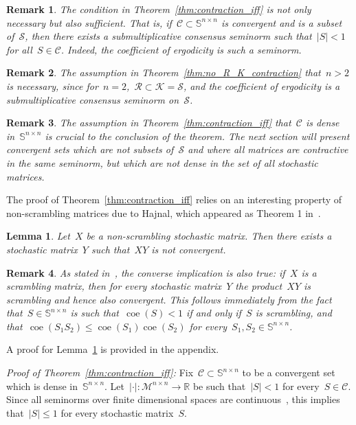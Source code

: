 \documentclass[letterpaper, 10 pt, conference]{ieeeconf}  %
\newtheorem{lemma}{Lemma}
\newtheorem{remark}{Remark}
\newcommand{\R}{\mathbb R}
\newcommand{\gensn}[1]{|#1|} %
\DeclareMathOperator{\coe}{coe} %
\newcommand{\eqrowsum}{\mathcal{M}} %
\newcommand{\stoc}{\mathbb{S}} %
\newcommand{\stocpd}{\mathcal{R}} %
\newcommand{\stocsary}{\mathcal{K}} %
\newcommand{\stocscr}{\mathcal{S}} %
\begin{document}
\begin{remark}
    The condition in Theorem~\ref{thm:contraction_iff} is not only necessary but also sufficient. That is, if~$\mathcal{C} \subset \stoc^{n \times n}$ is convergent and is a subset of~$\stocscr$, then there exists a submultiplicative consensus seminorm such that~$\gensn{S} < 1$ for all~$S \in \mathcal{C}$. Indeed, the coefficient of ergodicity is such a seminorm.
\end{remark}

\begin{remark}
    The assumption in Theorem~\ref{thm:no_R_K_contraction} that~$n > 2$ is necessary, since for~$n=2$,~$\stocpd \subset \stocsary = \stocscr$, and the coefficient of ergodicity is a submultiplicative consensus seminorm on~$\stocscr$.
\end{remark}

\begin{remark}
    The assumption in Theorem~\ref{thm:contraction_iff} that~$\mathcal{C}$ is dense in~$\stoc^{n \times n}$ is crucial to the conclusion of the theorem. The next section will present convergent sets which are not subsets of~$\stocscr$ and where all matrices are contractive in the same seminorm, but which are not dense in the set of all stochastic matrices.
\end{remark}

The proof of Theorem~\ref{thm:contraction_iff} relies on an interesting property of non-scrambling matrices due to Hajnal, which appeared as Theorem 1 in~\cite{Hajnal1958}.
\begin{lemma}\label{lem:scramb_characterize}
    Let~$X$ be a non-scrambling stochastic matrix. Then there exists a stochastic matrix~$Y$ such that~$XY$ is not convergent.
\end{lemma}
\begin{remark}
    As stated in~\cite{Hajnal1958}, the converse implication is also true: if~$X$ is a scrambling matrix, then for every stochastic matrix~$Y$ the product~$XY$ is scrambling and hence also convergent. This follows immediately from the fact that~$S \in \stoc^{n \times n}$ is such that~$\coe(S) < 1$ if and only if~$S$ is scrambling, and that~$\coe(S_1S_2) \le \coe(S_1) \coe(S_2)$ for every~$S_1,S_2 \in \stoc^{n \times n}$.
\end{remark}
A proof for Lemma~\ref{lem:scramb_characterize} is provided in the appendix.

\textit{Proof of Theorem~\ref{thm:contraction_iff}:}
    Fix~$\mathcal{C} \subset \stoc^{n \times n}$ to be a convergent set which is dense in~$\stoc^{n \times n}$. Let~$\gensn{\cdot} : \eqrowsum^{n \times n} \to \R$ be such that~$\gensn{S} < 1$ for every~$S \in \mathcal{C}$. Since all seminorms over finite dimensional spaces are continuous~\cite{Goldberg2017SeminormContinuous}, this implies that~$\gensn{S} \le 1$ for every stochastic matrix~$S$.
\end{document}

